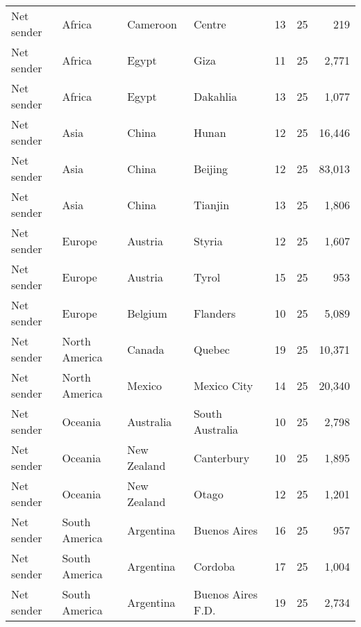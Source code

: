 \begin{tabular}{llllrrr}
 Net sender       & Africa        & Cameroon               & Centre             &             13 &          25 &          219 \\
 Net sender       & Africa        & Egypt                  & Giza               &             11 &          25 &        2,771 \\
 Net sender       & Africa        & Egypt                  & Dakahlia           &             13 &          25 &        1,077 \\
 Net sender       & Asia          & China                  & Hunan              &             12 &          25 &       16,446 \\
 Net sender       & Asia          & China                  & Beijing            &             12 &          25 &       83,013 \\
 Net sender       & Asia          & China                  & Tianjin            &             13 &          25 &        1,806 \\
 Net sender       & Europe        & Austria                & Styria             &             12 &          25 &        1,607 \\
 Net sender       & Europe        & Austria                & Tyrol              &             15 &          25 &          953 \\
 Net sender       & Europe        & Belgium                & Flanders           &             10 &          25 &        5,089 \\
 Net sender       & North America & Canada                 & Quebec             &             19 &          25 &       10,371 \\
 Net sender       & North America & Mexico                 & Mexico City        &             14 &          25 &       20,340 \\
 Net sender       & Oceania       & Australia              & South Australia    &             10 &          25 &        2,798 \\
 Net sender       & Oceania       & New Zealand            & Canterbury         &             10 &          25 &        1,895 \\
 Net sender       & Oceania       & New Zealand            & Otago              &             12 &          25 &        1,201 \\
 Net sender       & South America & Argentina              & Buenos Aires       &             16 &          25 &          957 \\
 Net sender       & South America & Argentina              & Cordoba            &             17 &          25 &        1,004 \\
 Net sender       & South America & Argentina              & Buenos Aires F.D.  &             19 &          25 &        2,734 \\
\hline
\end{tabular}